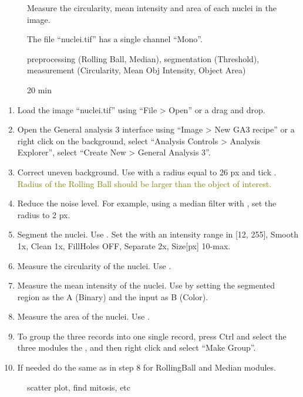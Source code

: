 \pagebreak
{}

\begin{description}
    \item[] Measure the circularity, mean intensity and area of each nuclei in the image.
    \item[] The file “nuclei.tif” has a single channel “Mono”.
    \item[] preprocessing (Rolling Ball, Median), segmentation (Threshold), measurement (Circularity, Mean Obj Intensity, Object Area)
    \item[] 20 min
    \item[]
\end{description}

\begin{enumerate}
    \item Load the image “nuclei.tif” using “File > Open” or a drag and drop.
    \item Open the General analysis 3 interface using “Image > New GA3 recipe” or a right click on the background, select “Analysis Controls > Analysis Explorer”, select “Create New > General Analysis 3”. 
    \item Correct uneven background. \soln Use  with a radius equal to 26 px and tick . \solnend \textcolor{olive}{Radius of the Rolling Ball should be larger than the object of interest.}
    \item Reduce the noise level. \soln For example, using a median filter with , set the radius to 2 px. \solnend
    \item Segment the nuclei. \soln Use . Set the with an intensity range in [12, 255], Smooth 1x, Clean 1x, FillHoles OFF, Separate 2x, Size[px] 10-max. \solnend
    \item Measure the circularity of the nuclei. \soln Use . \solnend 
    \item Measure the mean intensity of the nuclei. \soln Use  by setting the segmented region as the A (Binary) and the input as B (Color). \solnend
    \item Measure the area of the nuclei. \soln Use . \solnend
    \item To group the three records into one single record, press Ctrl and select the three modules the ,  and  then right click and select “Make Group”.
    \item If needed do the same as in step 8 for RollingBall and Median modules.
\end{enumerate}

\begin{description}
    \item[] scatter plot, find mitosis, etc
\end{description}
